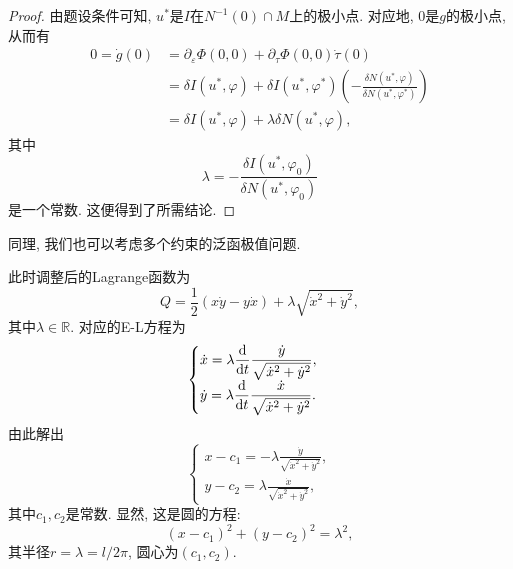 \begin{proposition}
\begin{proof}
        由题设条件可知, $u^*$是$I$在$N^{-1}(0) \cap M$上的极小点. 对应地, $0$是$g$的极小点, 从而有 
        \begin{align*}
            0 = \dot g(0) &= \partial_{\varepsilon}\Phi(0, 0) + \partial_{\tau}\Phi(0, 0)\dot\tau(0) \\ 
            &= \delta I(u^*, \varphi) + \delta I(u^*, \varphi^*)\left(-\frac{\delta N(u^*, \varphi)}{\delta N(u^*, \varphi^*)}\right) \\  
            &= \delta I(u^*, \varphi) + \lambda\delta N(u^*, \varphi), 
        \end{align*}
        其中 
        \begin{equation*}
            \lambda = -\frac{\delta I(u^*, \varphi_0)}{\delta N(u^*, \varphi_0)}
        \end{equation*}
        是一个常数. 这便得到了所需结论.
    \end{proof}
\end{proposition}

同理, 我们也可以考虑多个约束的泛函极值问题.

\begin{example}[等周问题-续]
    此时调整后的Lagrange函数为 
    \begin{equation*}
        Q = \frac{1}{2}(x\dot y - y\dot x) + \lambda \sqrt{\dot x^2 + \dot y^2}, 
    \end{equation*}
    其中$\lambda \in \mathbb{R}$. 对应的E-L方程为 
    \begin{equation*}
        \begin{cases} 
            \displaystyle\dot x = \lambda\frac{{\rm d}}{{\rm d}t}\frac{\dot y}{\sqrt{\dot x^2 + \dot y^2}}, \\  
            \displaystyle\dot y = \lambda\frac{{\rm d}}{{\rm d}t}\frac{\dot x}{\sqrt{\dot x^2 + \dot y^2}}. 
        \end{cases}
    \end{equation*}
    由此解出 
    \begin{equation*}
        \begin{cases} 
            \displaystyle x - c_1 = -\lambda\frac{\dot y}{\sqrt{\dot x^2 + \dot y^2}}, \\ 
            \displaystyle y - c_2 = \lambda\frac{\dot x}{\sqrt{\dot x^2 + \dot y^2}}, 
        \end{cases}
    \end{equation*}
    其中$c_1, c_2$是常数. 显然, 这是圆的方程:
    \begin{equation*}
        (x - c_1)^2 + (y - c_2)^2 = \lambda^2,
    \end{equation*}
    其半径$r = \lambda = l/2\pi$, 圆心为$(c_1, c_2)$.
\end{example}

